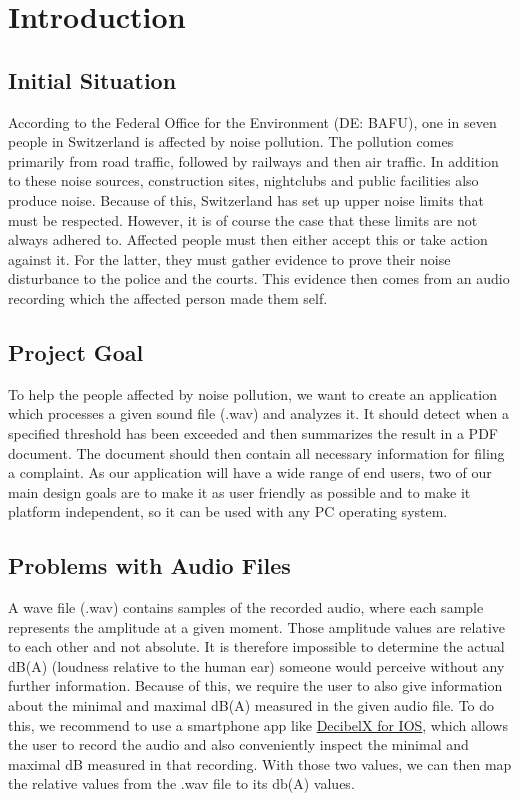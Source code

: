 \section{Introduction}

\subsection{Initial Situation}

According to the Federal Office for the Environment (DE: BAFU), one in seven people in Switzerland is affected by noise pollution.
The pollution comes primarily from road traffic, followed by railways and then air traffic.
In addition to these noise sources, construction sites, nightclubs and public facilities also produce noise.
Because of this, Switzerland has set up upper noise limits that must be respected.
However, it is of course the case that these limits are not always adhered to.
Affected people must then either accept this or take action against it.
For the latter, they must gather evidence to prove their noise disturbance to the police and the courts.
This evidence then comes from an audio recording which the affected person made them self.

\subsection{Project Goal}
To help the people affected by noise pollution, we want to create an application which processes a given sound file (.wav)
and analyzes it.
It should detect when a specified threshold has been exceeded and then summarizes the result in a PDF document.
The document should then contain all necessary information for filing a complaint.
As our application will have a wide range of end users, two of our main design goals are to make it as user friendly as possible
and to make it platform independent, so it can be used with any PC operating system.

\subsection{Problems with Audio Files}
A wave file (.wav) contains samples of the recorded audio, where each sample represents the amplitude at a given moment.
Those amplitude values are relative to each other and not absolute.
It is therefore impossible to determine the actual dB(A) (loudness relative to the human ear) someone would perceive without any further information.
Because of this, we require the user to also give information about the minimal and maximal dB(A) measured in the given
audio file.
To do this, we recommend to use a smartphone app like \href{https://apps.apple.com/ch/app/dezibel-x-dba-l%C3%A4rm-messger%C3%A4t/id448155923}{DecibelX for IOS},
which allows the user to record the audio and also conveniently inspect the minimal and maximal dB measured in that recording.
With those two values, we can then map the relative values from the .wav file to its db(A) values.